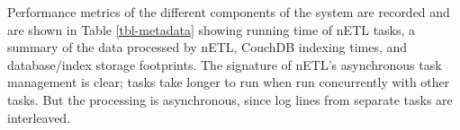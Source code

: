 Performance metrics of the different components of the system are recorded and are shown in Table \ref{tbl-metadata} showing running time of nETL tasks, a summary of the data processed by nETL, CouchDB indexing times, and database/index storage footprints. The signature of nETL's asynchronous task management is clear; tasks take longer to run when run concurrently with other tasks. But the processing is asynchronous, since log lines from separate tasks are interleaved.

